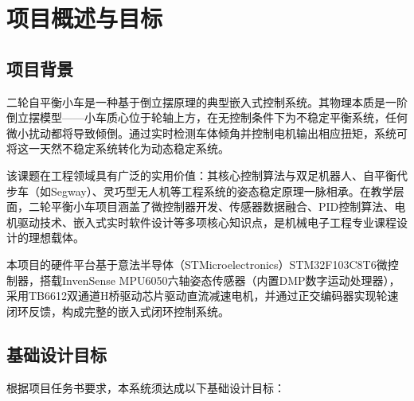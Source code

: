 \documentclass[12pt,a4paper,UTF8]{ctexrep}
\begin{document}
\restoregeometry

\newpage
\setcounter{page}{1}
\renewcommand{\contentsname}{\centering\heiti\zihao{3} 目\quad 录}
\tableofcontents

\newpage
\setcounter{page}{1}

\chapter{项目概述与目标}

\section{项目背景}

二轮自平衡小车是一种基于倒立摆原理的典型嵌入式控制系统。其物理本质是一阶倒立摆模型——小车质心位于轮轴上方，在无控制条件下为不稳定平衡系统，任何微小扰动都将导致倾倒。通过实时检测车体倾角并控制电机输出相应扭矩，系统可将这一天然不稳定系统转化为动态稳定系统。

该课题在工程领域具有广泛的实用价值：其核心控制算法与双足机器人、自平衡代步车（如Segway）、灵巧型无人机等工程系统的姿态稳定原理一脉相承。在教学层面，二轮平衡小车项目涵盖了微控制器开发、传感器数据融合、PID控制算法、电机驱动技术、嵌入式实时软件设计等多项核心知识点，是机械电子工程专业课程设计的理想载体。

本项目的硬件平台基于意法半导体（STMicro\-electronics）STM32F103C8T6微控制器，搭载InvenSense MPU6050六轴姿态传感器（内置DMP数字运动处理器），采用TB6612双通道H桥驱动芯片驱动直流减速电机，并通过正交编码器实现轮速闭环反馈，构成完整的嵌入式闭环控制系统。

\section{基础设计目标}

根据项目任务书要求，本系统须达成以下基础设计目标：
\end{document}
